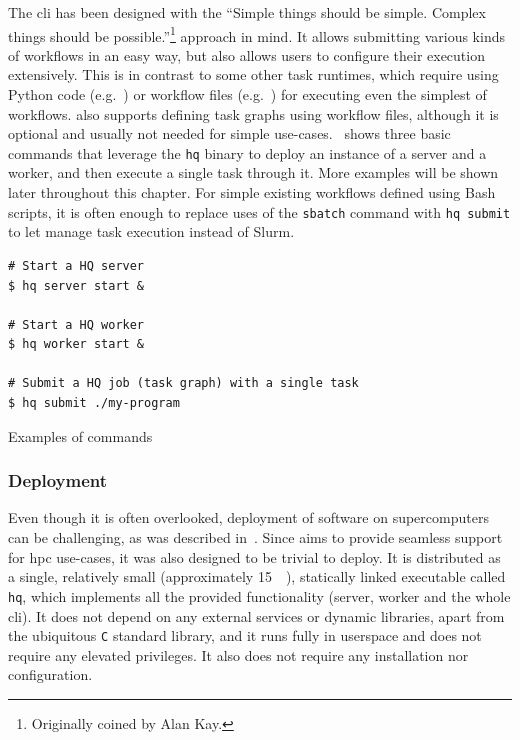 The \gls{cli} has been designed with the ``Simple things should be simple. Complex
things should be possible.''\footnote{Originally coined by Alan Kay.} approach in mind. It allows submitting various
kinds of workflows in an easy way, but also allows users to configure their execution extensively.
This is in contrast to some other task runtimes, which require using Python code (e.g.\
\dask{}) or workflow files (e.g.\ \snakemake{}) for executing even the
simplest of workflows. \hyperqueue{} also supports defining task graphs using workflow
files, although it is optional and usually not needed for simple use-cases.~
shows three basic commands that leverage the \texttt{hq} binary to deploy an instance
of a \hyperqueue{} server and a worker, and then execute a single task through it. More
examples will be shown later throughout this chapter. For simple existing workflows defined using
Bash scripts, it is often enough to replace uses of the \texttt{sbatch} command with
\texttt{hq submit} to let \hyperqueue{} manage task execution instead of Slurm.

\begin{listing}[h]
	\begin{verbatim}
# Start a HQ server
$ hq server start &

# Start a HQ worker
$ hq worker start &

# Submit a HQ job (task graph) with a single task
$ hq submit ./my-program
	\end{verbatim}
	\caption{Examples of \hyperqueue{}  commands}
	\label{lst:hq-cli-commands}
\end{listing}

\subsubsection*{Deployment}
Even though it is often overlooked, deployment of software on supercomputers can be challenging, as
was described in~\Autoref{challenge:deployment}. Since \hyperqueue{} aims to provide seamless
support for \gls{hpc} use-cases, it was also designed to be trivial to deploy. It is
distributed as a single, relatively small (approximately \SI{15}{\mebi\byte}), statically
linked executable called \texttt{hq}, which implements all the provided functionality
(server, worker and the whole \gls{cli}). It does not depend on any external services
or dynamic libraries, apart from the ubiquitous \texttt{C} standard library, and it
runs fully in userspace and does not require any elevated privileges. It also does not require any
installation nor configuration.

